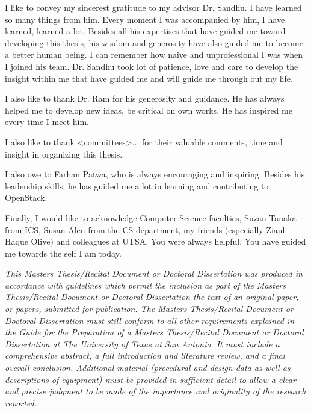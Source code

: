 \begin{acknowledgements}
I like to convey my sincerest gratitude to my advisor Dr. Sandhu. I have  learned so many things from him. Every moment I was accompanied by him, I have learned, learned a lot. Besides all his expertises that have guided me toward developing this thesis, his wisdom and generosity have also guided me to become a better human being. I can remember how naive and unprofessional I was when I joined his team. Dr. Sandhu took lot of patience, love and care to develop the insight within me that have guided me and will guide me through out my life. 

I also like to thank Dr. Ram for his generosity and guidance. He has always helped me to develop  new ideas, be critical on own works. He has inspired me every time I meet him.

I also like to thank <committees>... for their valuable comments, time and insight in organizing this thesis.

I also owe to Farhan Patwa, who is always encouraging and inspiring. Besides his leadership skills, he has guided me a lot in learning and contributing to OpenStack. 

Finally, I would like to acknowledge Computer Science faculties, Suzan Tanaka from ICS, Susan Alen from the CS department,  my friends (especially Ziaul Haque Olive) and colleagues at UTSA. You were always helpful. You have guided me towards the self I am today.

\begin{singlespace}
\emph{This Masters Thesis/Recital Document or Doctoral Dissertation
was produced in accordance with guidelines which permit the inclusion
as part of the Masters Thesis/Recital Document or Doctoral Dissertation
the text of an original paper, or papers, submitted for publication.
The Masters Thesis/Recital Document or Doctoral Dissertation must
still conform to all other requirements explained in the Guide for
the Preparation of a Masters Thesis/Recital Document or Doctoral Dissertation
at The University of Texas at San Antonio. It must include a comprehensive
abstract, a full introduction and literature review, and a final overall
conclusion. Additional material (procedural and design data as well
as descriptions of equipment) must be provided in sufficient detail
to allow a clear and precise judgment to be made of the importance
and originality of the research reported. }


\end{singlespace}
\end{acknowledgements}
